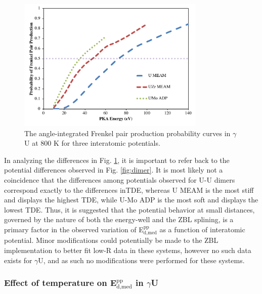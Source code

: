 \documentclass[review]{elsarticle}
\providecommand{\DIFaddbeginFL}{} %
\providecommand{\DIFaddendFL}{} %
\providecommand{\DIFdelbeginFL}{} %
\providecommand{\DIFdelendFL}{} %
\newcommand{\DIFscaledelfig}{0.5}
\newlength{\DIFdelgraphicswidth} %
\newlength{\DIFdelgraphicsheight} %
\newcommand{\DIFaddincludegraphics}[2][]{{\color{blue}\fbox{\DIFOincludegraphics[#1]{#2}}}} %
\newcommand{\DIFdelincludegraphics}[2][]{%
\sbox{\DIFdelgraphicsbox}{\DIFOincludegraphics[#1]{#2}}%
\settoboxwidth{\DIFdelgraphicswidth}{\DIFdelgraphicsbox} %
\settoboxtotalheight{\DIFdelgraphicsheight}{\DIFdelgraphicsbox} %
\scalebox{\DIFscaledelfig}{%
\parbox[b]{\DIFdelgraphicswidth}{\usebox{\DIFdelgraphicsbox}\\[-\baselineskip] \rule{\DIFdelgraphicswidth}{0em}}\llap{\resizebox{\DIFdelgraphicswidth}{\DIFdelgraphicsheight}{%
\setlength{\unitlength}{\DIFdelgraphicswidth}%
\begin{picture}(1,1)%
\thicklines\linethickness{2pt} %
{\color[rgb]{1,0,0}\put(0,0){\framebox(1,1){}}}%
{\color[rgb]{1,0,0}\put(0,0){\line( 1,1){1}}}%
{\color[rgb]{1,0,0}\put(0,1){\line(1,-1){1}}}%
\end{picture}%
}\hspace*{3pt}}} %
} %
\DeclareRobustCommand{\DIFaddbeginFL}{\DIFOaddbeginFL \let\includegraphics\DIFaddincludegraphics} %
\DeclareRobustCommand{\DIFaddendFL}{\DIFOaddendFL \let\includegraphics\DIFOincludegraphics} %
\DeclareRobustCommand{\DIFdelbeginFL}{\DIFOdelbeginFL \let\includegraphics\DIFdelincludegraphics} %
\DeclareRobustCommand{\DIFdelendFL}{\DIFOaddendFL \let\includegraphics\DIFOincludegraphics} %
\begin{document}
\begin{figure}[h]
 \centering
 \DIFdelbeginFL %
\DIFdelendFL \DIFaddbeginFL \includegraphics[width=0.8\textwidth]{gam800A.png} 
 \DIFaddendFL \caption{The angle-integrated Frenkel pair production probability curves in $\gamma$U at 800 K for three interatomic potentials.}
 \label{fig:gam800}
\end{figure}

In analyzing the differences in Fig. \ref{fig:gam800}, it is important to refer back to the potential differences observed in Fig. \ref{fig:dimer}. It is most likely not a coincidence that the differences among potentials observed for U-U dimers correspond exactly to the differences inTDE, whereas U MEAM is the most stiff and displays the highest TDE, while U-Mo ADP is the most soft and displays the lowest TDE. Thus, it is suggested that the potential behavior at small distances, governed by the nature of both the energy-well and the ZBL splining, is a primary factor in the observed variation of E$^{\textrm{pp}}_{\textrm{d,med}}$ as a function of interatomic potential. Minor modifications could potentially be made to the ZBL implementation to better fit low-R data in these systems, however no such data exists for $\gamma$U, and as such no modifications were performed for these systems.

\FloatBarrier

\subsubsection{Effect of temperature on E$^{\textrm{pp}}_{\textrm{d,med}}$ in $\gamma$U}
\end{document}
